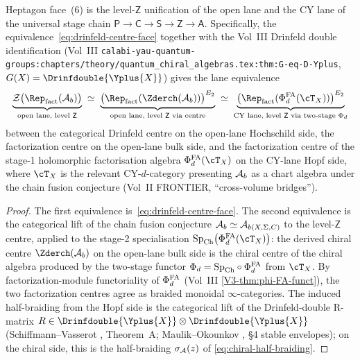 \begin{corollary}
\label{cor:open-cy-lane-unification}%
%
%
Heptagon face~(6) is the level-$\mathsf{Z}$ unification of the open
lane and the CY lane of the universal stage chain
$\mathsf{P} \to \mathsf{C} \to \mathsf{S} \to \mathsf{Z} \to \mathsf{A}$.
Specifically, the equivalence~\eqref{eq:drinfeld-centre-face} together
with the Vol~III Drinfeld double identification
\textup(Vol~III \texttt{calabi-yau-quantum-groups:chapters/theory/quantum\_chiral\_algebras.tex:thm:G-eq-D-Yplus},
$G(X) = \Drinfdouble{\Yplus{X}}$\textup) gives the lane equivalence
\begin{equation}\label{eq:open-cy-lane-equivalence}
\underbrace{\cZ\bigl(\Rep_{\mathrm{fact}}(\cA_b)\bigr)}_{\text{open lane,
level } \mathsf{Z}}
\;\simeq\;
\underbrace{\bigl(\Rep_{\mathrm{fact}}(\Zderch(\cA_b))\bigr)^{E_2}}_{\text{open lane,
level } \mathsf{Z}\text{ via centre}}
\;\simeq\;
\underbrace{\bigl(\Rep_{\mathrm{fact}}(\PhiFA_d(\cT_X))\bigr)^{E_2}}_{\text{CY lane,
level } \mathsf{Z}\text{ via two-stage } \Phi_d}
\end{equation}
between the categorical Drinfeld centre on the open-lane Hochschild
side, the factorization centre on the open-lane bulk side, and the
factorization centre of the stage-1 holomorphic factorisation
algebra $\PhiFA_d(\cT_X)$ on the CY-lane Hopf side, where
$\cT_X$ is the relevant CY-$d$-category presenting $\mathcal{A}_b$ as a
chart algebra under the chain fusion conjecture
\textup(Vol~II FRONTIER, ``cross-volume bridges''\textup).
\end{corollary}

\begin{proof}
The first equivalence is~\eqref{eq:drinfeld-centre-face}. The second
equivalence is the categorical lift of the chain fusion conjecture
$\mathcal{A}_b \simeq \mathcal{A}_{b(X, \Sigma, C)}$ to the level-$\mathsf{Z}$ centre,
applied to the stage-2 specialisation $\SpCh\bigl(\PhiFA_d(\cT_X)\bigr)$:
the derived chiral centre $\Zderch(\cA_b)$ on the open-lane bulk side
is the chiral centre of the chiral algebra produced by the two-stage
functor $\Phi_d = \mathrm{Sp}_{\mathrm{Ch}} \circ \Phi^{\mathrm{FA}}_d$ from $\cT_X$. By
factorization-module functoriality of $\Phi^{\mathrm{FA}}_d$ \textup(Vol~III
\cref{V3-thm:phi-FA-funct}\textup), the two factorization centres
agree as braided monoidal $\infty$-categories. The induced
half-braiding from the Hopf side is the categorical lift of the
Drinfeld-double R-matrix $R \in \Drinfdouble{\Yplus{X}} \otimes
\Drinfdouble{\Yplus{X}}$ \textup(Schiffmann--Vasserot
\cite{SchiffmannVasserot2013}, Theorem~A; Maulik--Okounkov
\cite{MaulikOkounkov2012}, \S 4 stable envelopes\textup); on the
chiral side, this is the half-braiding $\sigma_{\mathcal{A}}(z)$ of
\eqref{eq:chiral-half-braiding}.
\end{proof}


